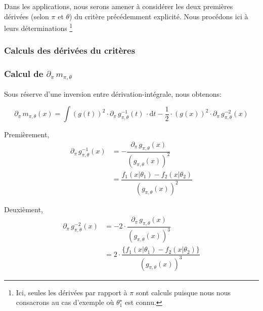 \documentclass{article}
\begin{document}
    Dans les applications, nous serons amener à considérer les deux premières dérivées (selon $\pi$ et $\theta$) du critère précédemment explicité. Nous procédons ici à leurs déterminations \footnote{Ici, seules les dérivées par rapport à $\pi$ sont calculs puisque nous nous consacrons au cas d'exemple où $\theta_1^\star$ est connu.}

    \subsubsection{Calculs des dérivées du critères}

    \subsubsection*{Calcul de $\partial_\pi\,m_{\pi,\theta}$}

    {\color{red} Sous réserve d'une inversion entre dérivation-intégrale}, nous obtenons:

    $$\partial_\pi\,m_{\pi,\theta}(x) = \int(g(t))^2\cdot\partial_\pi\,g_{\pi,\theta}^{-1}(t)\,\cdot\mathrm{d}t - \dfrac{1}{2}\cdot(g(x))^2\cdot\partial_\pi\,g_{\pi,\theta}^{-2}(x) $$

    Premièrement,
    \begin{align*}
        \partial_\pi\, g_{\pi,\theta}^{-1}(x)   & = -\dfrac{\partial_\pi\,g_{\pi,\theta}(x)}{(g_{\pi,\theta}(x))^2} \\
                                                & = \dfrac{f_1(x|\theta_1)-f_2(x|\theta_2)}{(g_{\pi,\theta}(x))^2}
    \end{align*}

    Deuxièment,
    \begin{align*}
        \partial_\pi\,g_{\pi,\theta}^{-2}(x)  &= -2\cdot\dfrac{\partial_\pi\,g_{\pi,\theta}(x)}{(g_{\pi,\theta}(x))^3} \\
                                            &= 2\cdot\dfrac{\big\{f_1(x|\theta_1)-f_2(x|\theta_2)\big\}}{(g_{\pi,\theta}(x))^3}
    \end{align*}
\end{document}
